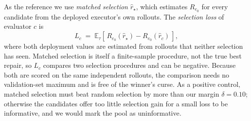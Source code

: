 \documentclass{article}
\theoremstyle{plain}
\theoremstyle{definition}
\theoremstyle{remark}
\begin{document}
As the reference we use \emph{matched selection} $\hat r_\star$, which estimates $R_{e_0}$ for every candidate from the deployed executor's own rollouts. The \emph{selection loss} of evaluator $c$ is
\begin{equation}
  L_c \;=\; \mathbb{E}_\tau\!\left[\,R_{e_0}(\hat r_\star)-R_{e_0}(\hat r_c)\,\right],
  \label{eq:loss}
\end{equation}
where both deployment values are estimated from rollouts that neither selection has seen. Matched selection is itself a finite-sample procedure, not the true best repair, so $L_c$ compares two selection procedures and can be negative. Because both are scored on the same independent rollouts, the comparison needs no validation-set maximum and is free of the winner's curse. As a positive control, matched selection must beat random selection by more than our margin $\delta=0.10$; otherwise the candidates offer too little selection gain for a small loss to be informative, and we would mark the pool as uninformative.
\end{document}
